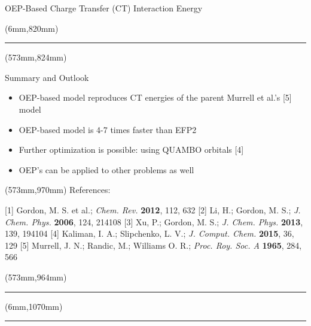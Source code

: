 \documentclass[final]{beamer} %
\begin{document}
\begin{frame}{OEP-Based Charge Transfer (CT) Interaction Energy}
\begin{textblock*}{820mm}(6mm,820mm)
\noindent\rule{83cm}{5.4pt}
\end{textblock*}


\begin{textblock*}{257mm}(573mm,824mm)
\begin{block}{Summary and Outlook}
 \begin{itemize}
   \item OEP-based model {\color{blue} reproduces} CT energies of the parent Murrell et al.'s [5] model
   \item OEP-based model is 4-7 times {\color{blue} faster} than EFP2
   \item Further optimization is {\color{blue} possible}: using QUAMBO orbitals [4]
   \item OEP's can be applied to {\color{blue} other problems} as well
 \end{itemize}
\end{block}
\end{textblock*}

\begin{textblock*}{257mm}(573mm,970mm)
    References: %
    \begin{small}
[1] Gordon, M. S. et al.; \emph{Chem. Rev.} {\bf{\small 2012}}, 112, 632 
[2] Li, H.; Gordon, M. S.; \emph{J. Chem. Phys.} {\bf{\small 2006}}, 124, 214108
[3] Xu, P.; Gordon, M. S.; \emph{J. Chem. Phys.} {\bf{\small 2013}}, 139, 194104
[4] Kaliman, I. A.; Slipchenko, L. V.; \emph{J. Comput. Chem.} {\bf{\small 2015}}, 36, 129
[5] Murrell, J. N.; Randic, M.; Williams O. R.; \emph{Proc. Roy. Soc. A} {\bf{\small 1965}}, 284, 566
    \end{small}         
\end{textblock*}
\begin{textblock*}{257mm}(573mm,964mm)
\noindent\rule{83cm}{5.4pt}
\end{textblock*}


\begin{textblock*}{820mm}(6mm,1070mm)
\noindent\rule{83cm}{5.4pt}
\end{textblock*}



\end{frame}
\end{document}
